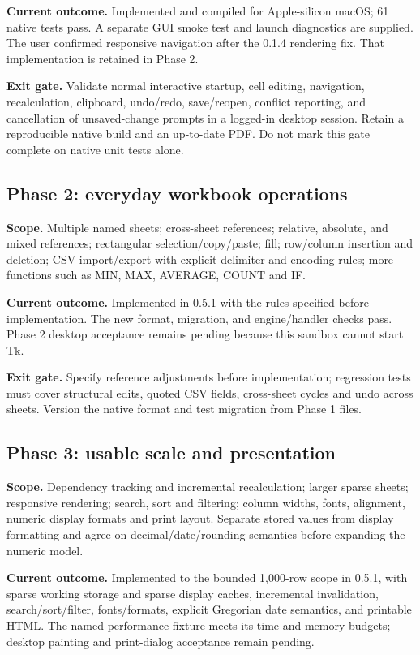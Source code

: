 \documentclass[11pt,letterpaper]{article}
\begin{document}
\textbf{Current outcome.} Implemented and compiled for Apple-silicon macOS; 61
native tests pass. A separate GUI smoke test and launch diagnostics are supplied.
The user confirmed responsive navigation after the 0.1.4 rendering fix.
That implementation is retained in Phase 2.

\textbf{Exit gate.} Validate normal interactive startup, cell editing, navigation,
recalculation, clipboard, undo/redo, save/reopen, conflict reporting, and cancellation
of unsaved-change prompts in a logged-in desktop session. Retain a reproducible
native build and an up-to-date PDF. Do not mark this gate complete on native unit
tests alone.

\subsection*{Phase 2: everyday workbook operations}
\textbf{Scope.} Multiple named sheets; cross-sheet references; relative, absolute,
and mixed references; rectangular selection/copy/paste; fill; row/column insertion
and deletion; CSV import/export with explicit delimiter and encoding rules; more
functions such as MIN, MAX, AVERAGE, COUNT and IF.

\textbf{Current outcome.} Implemented in 0.5.1 with the rules specified before
implementation. The new format, migration, and engine/handler checks pass.
Phase 2 desktop acceptance remains pending because this sandbox cannot start Tk.

\textbf{Exit gate.} Specify reference adjustments before implementation; regression
tests must cover structural edits, quoted CSV fields, cross-sheet cycles and undo
across sheets. Version the native format and test migration from Phase 1 files.

\subsection*{Phase 3: usable scale and presentation}
\textbf{Scope.} Dependency tracking and incremental recalculation; larger sparse
sheets; responsive rendering; search, sort and filtering; column widths, fonts,
alignment, numeric display formats and print layout. Separate stored values from
display formatting and agree on decimal/date/rounding semantics before expanding
the numeric model.

\textbf{Current outcome.} Implemented to the bounded 1,000-row scope in 0.5.1,
with sparse working storage and sparse display caches, incremental invalidation,
search/sort/filter, fonts/formats, explicit Gregorian date semantics, and printable
HTML. The named performance fixture meets its time and memory budgets; desktop
painting and print-dialog acceptance remain pending.
\end{document}
